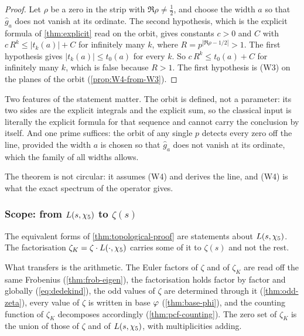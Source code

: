 \begin{proof}
Let $\rho$ be a zero in the strip with $\Re\rho\neq\tfrac12$, and choose the width $a$ so that $\hat g_a$ does not vanish
at its ordinate.  The second hypothesis, which is the explicit formula of \cref{thm:explicit} read on the orbit, gives
constants $c>0$ and $C$ with $c\,R^k\le|t_k(a)|+C$ for infinitely many $k$, where $R=p^{|\Re\rho-1/2|}>1$.  The first
hypothesis gives $|t_k(a)|\le t_0(a)$ for every $k$.  So $c\,R^k\le t_0(a)+C$ for infinitely many $k$, which is false
because $R>1$.  The first hypothesis is \textup{(W3)} on the planes of the orbit (\cref{prop:W4-from-W3}).
\end{proof}

Two features of the statement matter.  The orbit is defined, not a parameter: its two sides
are the explicit integrals and the explicit sum, so the classical input is literally the
explicit formula for that sequence and cannot carry the conclusion by itself.  And one prime
suffices: the orbit of any single $p$ detects every zero off the line, provided the width $a$
is chosen so that $\hat g_a$ does not vanish at its ordinate, which the family of all widths
allows.

The theorem is not circular: it assumes (W4) and derives the line, and (W4) is what the exact
spectrum of the operator gives.

\subsubsection{Scope: from $L(s,\chi_5)$ to $\zeta(s)$}\label{ssec:scope-zeta}
The equivalent forms of \cref{thm:topological-proof} are statements about $L(s,\chi_5)$.  The
factorisation $\zeta_K=\zeta\cdot L(\cdot,\chi_5)$ carries some of it to $\zeta(s)$ and
not the rest.

What transfers is the arithmetic.  The Euler factors of $\zeta$ and of $\zeta_K$ are read
off the same Frobenius (\cref{thm:frob-eigen}), the factorisation holds factor by
factor and globally (\cref{eq:dedekind}), the odd values of $\zeta$ are determined
through it (\cref{thm:odd-zeta}), every value of $\zeta$ is written in base $\varphi$
(\cref{thm:base-phi}), and the counting function of $\zeta_K$ decomposes accordingly
(\cref{thm:pcf-counting}).  The zero set of $\zeta_K$ is the union of those of $\zeta$
and of $L(s,\chi_5)$, with multiplicities adding.

